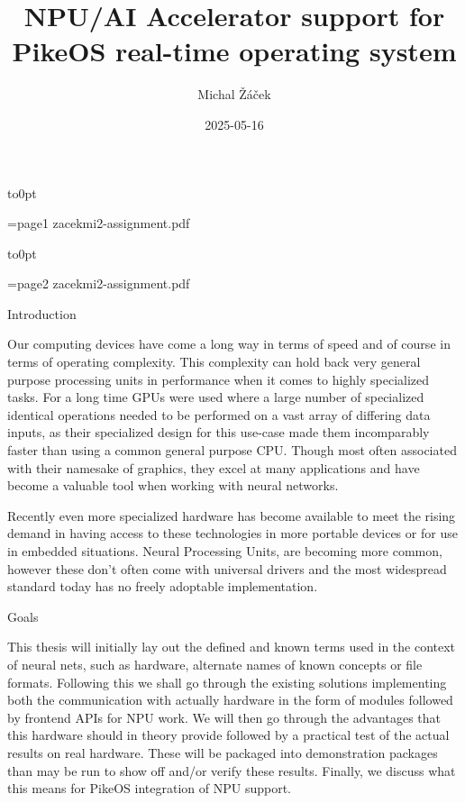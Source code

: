 \load[ctustyle3]
\worktype[B/EN]
\title{NPU/AI Accelerator support for PikeOS real-time operating system}
\author{Michal Žáček}
\date{2025-05-16}
\draft

\def\textemdash{-}
\def\texttrademark{™}

\def\OpenVX{OpenVX\texttrademark}
\def\VeriSilicon{VeriSilicon}
\def\NXP{NXP}

\totf

\def\insertassignmentpage[#1]{
        \nopagenumbers
        \vbox to0pt{\vskip-25mm\centerline{\picparams={#1} \inspic zacekmi2-assignment.pdf }\vss}
        \break
}

\insertassignmentpage[page1]
\insertassignmentpage[page2]

\makefront

\chap Introduction

Our computing devices have come a long way in terms of speed
and of course in terms of operating complexity.
This complexity can hold back very general purpose processing units
in performance when it comes to highly specialized tasks.
For a long time GPUs were used where a large number
of specialized identical operations needed to be performed on
a vast array of differing data inputs,
as their specialized design for this use-case made them incomparably faster than
using a common general purpose CPU.
Though most often associated with their namesake of graphics,
they excel at many applications and have become a
valuable tool when working with neural networks.

Recently even more specialized hardware has become available
to meet the rising demand in having access to these technologies
in more portable devices or for use in embedded situations.
Neural Processing Units,
are becoming more common,
however these don't often come with universal drivers
and the most widespread standard today has no freely adoptable implementation.

\sec Goals

This thesis will initially lay out the defined and known terms used in the context of neural nets, such as hardware, alternate names of known concepts or file formats.
Following this we shall go through the existing solutions implementing both the communication with actually hardware in the form of modules followed by frontend APIs for NPU work.
We will then go through the advantages that this hardware should in theory provide followed by a practical test of the actual results on real hardware.
These will be packaged into demonstration packages than may be run to show off and/or verify these results.
Finally, we discuss what this means for PikeOS integration of NPU support.


